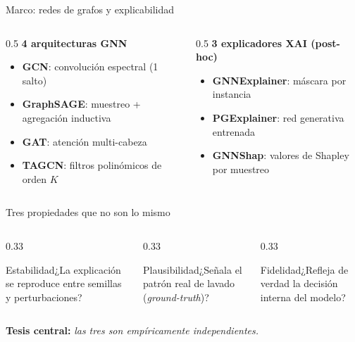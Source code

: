 \documentclass[aspectratio=169,11pt]{beamer}
\begin{document}
\begin{frame}{Marco: redes de grafos y explicabilidad}
\begin{columns}[T]
\begin{column}{0.5\textwidth}
\textbf{\color{navy}4 arquitecturas GNN}
\begin{itemize}\small
  \item \textbf{GCN}: convolución espectral (1 salto)
  \item \textbf{GraphSAGE}: muestreo + agregación inductiva
  \item \textbf{GAT}: atención multi-cabeza
  \item \textbf{TAGCN}: filtros polinómicos de orden $K$
\end{itemize}
\end{column}
\begin{column}{0.5\textwidth}
\textbf{\color{navy}3 explicadores XAI (post-hoc)}
\begin{itemize}\small
  \item \textbf{GNNExplainer}: máscara por instancia
  \item \textbf{PGExplainer}: red generativa entrenada
  \item \textbf{GNNShap}: valores de Shapley por muestreo
\end{itemize}
\end{column}
\end{columns}
\end{frame}

\begin{frame}{Tres propiedades que no son lo mismo}
\begin{columns}[T]
\begin{column}{0.33\textwidth}
\begin{block}{Estabilidad}\small ¿La explicación se reproduce entre semillas y perturbaciones?\end{block}
\end{column}
\begin{column}{0.33\textwidth}
\begin{block}{Plausibilidad}\small ¿Señala el patrón real de lavado (\textit{ground-truth})?\end{block}
\end{column}
\begin{column}{0.33\textwidth}
\begin{block}{Fidelidad}\small ¿Refleja de verdad la decisión interna del modelo?\end{block}
\end{column}
\end{columns}
\vspace{10pt}
\begin{center}
\textcolor{amber}{\textbf{Tesis central:}} \textit{las tres son empíricamente independientes.}
\end{center}
\end{frame}
\end{document}
